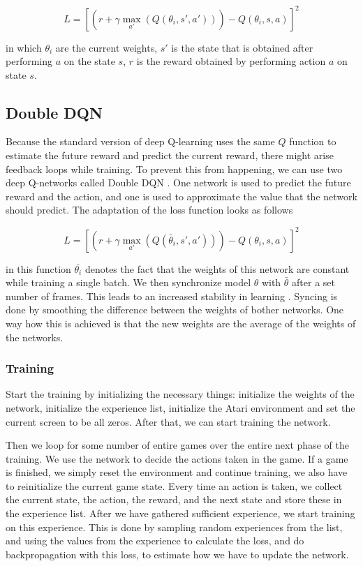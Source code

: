 \documentclass{article}
\begin{document}
\[
	L = \left[\left(r + \gamma \max_{a'}( Q(\theta_i, s',a'))\right) - Q(\theta_i, s, a)\right]^2
\]

in which $\theta_i$ are the current weights, $s'$ is the state that is obtained after performing $a$ on the state $s$, $r$ is the reward obtained by performing action $a$ on state $s$.

\subsection{Double DQN} \label{sec:doubleDQN}

Because the standard version of deep Q-learning uses the same $Q$ function to estimate the future reward and predict the current reward, there might arise feedback loops while training. To prevent this from happening, we can use two deep Q-networks called Double DQN \cite{van2016deep}. One network is used to predict the future reward and the action, and one is used to approximate the value that the network should predict. The adaptation of the loss function looks as follows

\[
	L = \left[\left(r + \gamma \max_{a'}( Q(\bar\theta_i, s',a'))\right) - Q(\theta_i, s, a)\right]^2
\]

in this function $\bar{\theta_i}
$ denotes the fact that the weights of this network are constant while training a single batch. 
We then synchronize model $\theta$ with $\bar\theta$ after a set number of frames. This leads to an increased stability in learning \cite{van2016deep}. Syncing is done by smoothing the difference between the weights of bother networks. One way how this is achieved is that the new weights are the average of the weights of the networks.


\subsubsection{Training}

Start the training by initializing the necessary things: initialize the weights of the network, initialize the experience list, initialize the Atari environment and set the current screen to be all zeros. After that, we can start training the network. 

Then we loop for some number of entire games over the entire next phase of the training. We use the network to decide the actions taken in the game. If a game is finished, we simply reset the environment and continue training, we also have to reinitialize the current game state. Every time an action is taken, we collect the current state, the action, the reward, and the next state and store these in the experience list. After we have gathered sufficient experience, we start training on this experience. This is done by sampling random experiences from the list, and using the values from the experience to calculate the loss, and do backpropagation with this loss, to estimate how we have to update the network. 
\end{document}
